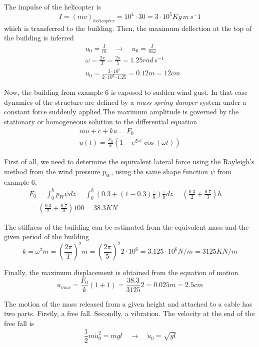 \documentclass{problems}
\begin{document}
The impulse of the helicopter is
$$
I = (mv)_{helicopter} = 10^4 \cdot 30 = 3\cdot 10^5 Kg\,m\,s^-1
$$
which is transferred to the building. Then, the maximum deflection at the top of the building is inferred
\begin{align*}
&\dot{u}_0 = \frac{I}{m} \quad \rightarrow \quad u_0 = \frac{I}{m\omega} \\
&\omega = \frac{2\pi}{T} = \frac{2\pi}{5} = 1.25rad\,s^{-1} \\
&u_0 = \frac{3\cdot 10^5}{2\cdot 10^6\cdot 1.25} = 0.12m = 12cm
\end{align*}



Now, the building from example 6 is exposed to sudden wind gust. In that case dynamics of the  structure are defined by a \emph{mass spring damper} system under a constant force suddenly applied.The maximum amplitude is governed by the stationary or homogeneous solution to the differential equation
\begin{align*}
m\ddot{u} + c + ku = F_0 \\
u(t) = \frac{F_0}{k}(1 -e^{\xi\omega t}\cos(\omega t))
\end{align*}

First of all, we need to determine the equivalent lateral force using the Rayleigh's method from the wind pressure $p_W$, using the same shape function $\psi$ from example 6,
\begin{align*}
F_0 = \int_0^h p_W\psi dz = \int_0^h \left(0.3 + (1-0.3)\frac{z}{h}\right)\frac{z}{h}dz = \left(\frac{0.3}{2} + \frac{0.7}{3}\right)h = \\
= \left(\frac{0.3}{2} + \frac{0.7}{3}\right)100 = 38.3KN
\end{align*}

The stiffness of the building can be estimated from the equivalent mass and the given period of the building
$$
k = \omega^2m = \left(\frac{2\pi}{T}\right)^2m = \left(\frac{2\pi}{5}\right)^2 2\cdot 10^6 = 3.125\cdot 10^6 N/m = 3125KN/m
$$

Finally, the maximum displacement is obtained from the equation of motion
$$
u_{max} = \frac{F_0}{k}(1+1) = \frac{38.3}{3125}2 = 0.025m = 2.5cm
$$



The motion of the mass released from a given height and attached to a cable has two parts. Firstly, a free fall. Secondly, a vibration. The velocity at the end of the free fall is
$$
\frac{1}{2}m\dot{u}_0^2 = mgl \quad \rightarrow \quad \dot{u}_0 = \sqrt{gl}
$$
\end{document}
